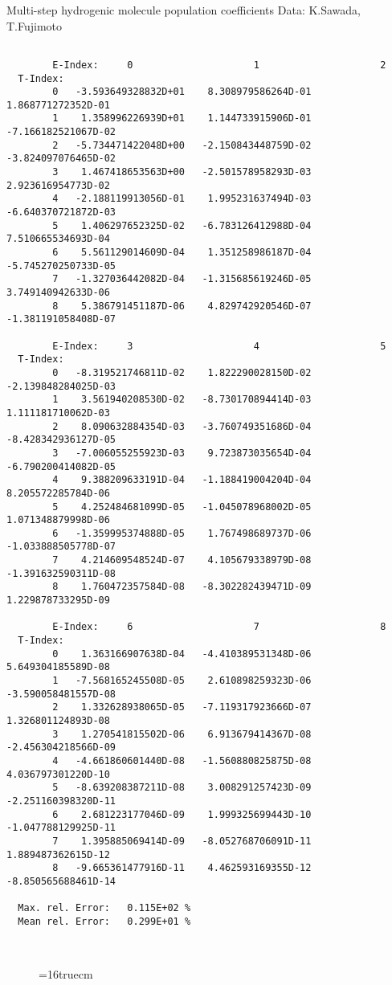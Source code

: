 \documentclass[12pt,dvipdfmx]{article}
\begin{document}
 Multi-step hydrogenic molecule population coefficients
 Data: K.Sawada, T.Fujimoto \cite{kn:Sawada}
\begin{small}\begin{verbatim}

        E-Index:     0                     1                     2
  T-Index:
        0   -3.593649328832D+01    8.308979586264D-01    1.868771272352D-01
        1    1.358996226939D+01    1.144733915906D-01   -7.166182521067D-02
        2   -5.734471422048D+00   -2.150843448759D-02   -3.824097076465D-02
        3    1.467418653563D+00   -2.501578958293D-03    2.923616954773D-02
        4   -2.188119913056D-01    1.995231637494D-03   -6.640370721872D-03
        5    1.406297652325D-02   -6.783126412988D-04    7.510665534693D-04
        6    5.561129014609D-04    1.351258986187D-04   -5.745270250733D-05
        7   -1.327036442082D-04   -1.315685619246D-05    3.749140942633D-06
        8    5.386791451187D-06    4.829742920546D-07   -1.381191058408D-07

        E-Index:     3                     4                     5
  T-Index:
        0   -8.319521746811D-02    1.822290028150D-02   -2.139848284025D-03
        1    3.561940208530D-02   -8.730170894414D-03    1.111181710062D-03
        2    8.090632884354D-03   -3.760749351686D-04   -8.428342936127D-05
        3   -7.006055255923D-03    9.723873035654D-04   -6.790200414082D-05
        4    9.388209633191D-04   -1.188419004204D-04    8.205572285784D-06
        5    4.252484681099D-05   -1.045078968002D-05    1.071348879998D-06
        6   -1.359995374888D-05    1.767498689737D-06   -1.033888505778D-07
        7    4.214609548524D-07    4.105679338979D-08   -1.391632590311D-08
        8    1.760472357584D-08   -8.302282439471D-09    1.229878733295D-09

        E-Index:     6                     7                     8
  T-Index:
        0    1.363166907638D-04   -4.410389531348D-06    5.649304185589D-08
        1   -7.568165245508D-05    2.610898259323D-06   -3.590058481557D-08
        2    1.332628938065D-05   -7.119317923666D-07    1.326801124893D-08
        3    1.270541815502D-06    6.913679414367D-08   -2.456304218566D-09
        4   -4.661860601440D-08   -1.560880825875D-08    4.036797301220D-10
        5   -8.639208387211D-08    3.008291257423D-09   -2.251160398320D-11
        6    2.681223177046D-09    1.999325699443D-10   -1.047788129925D-11
        7    1.395885069414D-09   -8.052768706091D-11    1.889487362615D-12
        8   -9.665361477916D-11    4.462593169355D-12   -8.850565688461D-14

  Max. rel. Error:   0.115E+02 %
  Mean rel. Error:   0.299E+01 %



\end{verbatim}\end{small}
\begin{figure} \label{2.2.5we}
\epsfxsize=16truecm
\end{figure}
\end{document}
